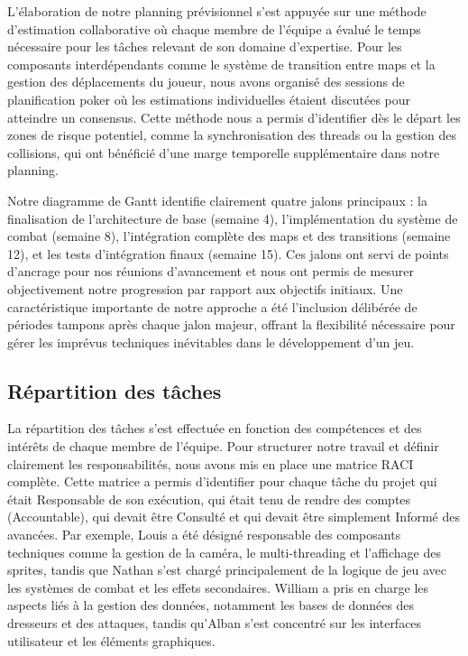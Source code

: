 \documentclass[12pt,a4paper, twoside]{article}
\begin{document}
L'élaboration de notre planning prévisionnel s'est appuyée sur une méthode d'estimation collaborative où chaque membre de l'équipe a évalué le temps nécessaire pour les tâches relevant de son domaine d'expertise. Pour les composants interdépendants comme le système de transition entre maps et la gestion des déplacements du joueur, nous avons organisé des sessions de planification poker où les estimations individuelles étaient discutées pour atteindre un consensus. Cette méthode nous a permis d'identifier dès le départ les zones de risque potentiel, comme la synchronisation des threads ou la gestion des collisions, qui ont bénéficié d'une marge temporelle supplémentaire dans notre planning.

Notre diagramme de Gantt identifie clairement quatre jalons principaux : la finalisation de l'architecture de base (semaine 4), l'implémentation du système de combat (semaine 8), l'intégration complète des maps et des transitions (semaine 12), et les tests d'intégration finaux (semaine 15). Ces jalons ont servi de points d'ancrage pour nos réunions d'avancement et nous ont permis de mesurer objectivement notre progression par rapport aux objectifs initiaux. Une caractéristique importante de notre approche a été l'inclusion délibérée de périodes tampons après chaque jalon majeur, offrant la flexibilité nécessaire pour gérer les imprévus techniques inévitables dans le développement d'un jeu.

\subsection{Répartition des tâches}
La répartition des tâches s'est effectuée en fonction des compétences et des intérêts de chaque membre de l'équipe. Pour structurer notre travail et définir clairement les responsabilités, nous avons mis en place une matrice RACI complète. Cette matrice a permis d'identifier pour chaque tâche du projet qui était Responsable de son exécution, qui était tenu de rendre des comptes (Accountable), qui devait être Consulté et qui devait être simplement Informé des avancées. Par exemple, Louis a été désigné responsable des composants techniques comme la gestion de la caméra, le multi-threading et l'affichage des sprites, tandis que Nathan s'est chargé principalement de la logique de jeu avec les systèmes de combat et les effets secondaires. William a pris en charge les aspects liés à la gestion des données, notamment les bases de données des dresseurs et des attaques, tandis qu'Alban s'est concentré sur les interfaces utilisateur et les éléments graphiques.
\end{document}
